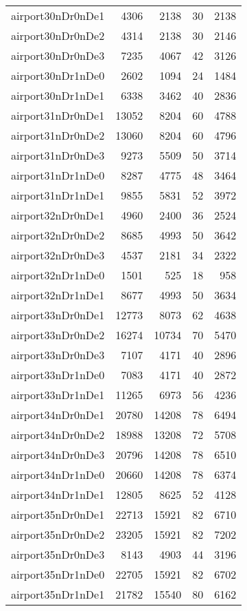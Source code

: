 \begin{longtable}{lrrrr}
airport30nDr0nDe1 & 4306 & 2138 & 30 & 2138 \\
airport30nDr0nDe2 & 4314 & 2138 & 30 & 2146 \\
airport30nDr0nDe3 & 7235 & 4067 & 42 & 3126 \\
airport30nDr1nDe0 & 2602 & 1094 & 24 & 1484 \\
airport30nDr1nDe1 & 6338 & 3462 & 40 & 2836 \\
airport31nDr0nDe1 & 13052 & 8204 & 60 & 4788 \\
airport31nDr0nDe2 & 13060 & 8204 & 60 & 4796 \\
airport31nDr0nDe3 & 9273 & 5509 & 50 & 3714 \\
airport31nDr1nDe0 & 8287 & 4775 & 48 & 3464 \\
airport31nDr1nDe1 & 9855 & 5831 & 52 & 3972 \\
airport32nDr0nDe1 & 4960 & 2400 & 36 & 2524 \\
airport32nDr0nDe2 & 8685 & 4993 & 50 & 3642 \\
airport32nDr0nDe3 & 4537 & 2181 & 34 & 2322 \\
airport32nDr1nDe0 & 1501 & 525 & 18 & 958 \\
airport32nDr1nDe1 & 8677 & 4993 & 50 & 3634 \\
airport33nDr0nDe1 & 12773 & 8073 & 62 & 4638 \\
airport33nDr0nDe2 & 16274 & 10734 & 70 & 5470 \\
airport33nDr0nDe3 & 7107 & 4171 & 40 & 2896 \\
airport33nDr1nDe0 & 7083 & 4171 & 40 & 2872 \\
airport33nDr1nDe1 & 11265 & 6973 & 56 & 4236 \\
airport34nDr0nDe1 & 20780 & 14208 & 78 & 6494 \\
airport34nDr0nDe2 & 18988 & 13208 & 72 & 5708 \\
airport34nDr0nDe3 & 20796 & 14208 & 78 & 6510 \\
airport34nDr1nDe0 & 20660 & 14208 & 78 & 6374 \\
airport34nDr1nDe1 & 12805 & 8625 & 52 & 4128 \\
airport35nDr0nDe1 & 22713 & 15921 & 82 & 6710 \\
airport35nDr0nDe2 & 23205 & 15921 & 82 & 7202 \\
airport35nDr0nDe3 & 8143 & 4903 & 44 & 3196 \\
airport35nDr1nDe0 & 22705 & 15921 & 82 & 6702 \\
airport35nDr1nDe1 & 21782 & 15540 & 80 & 6162 \\

\end{longtable}
